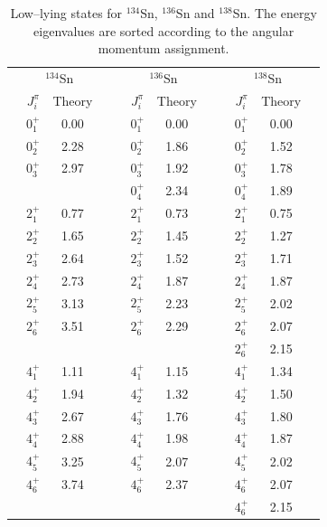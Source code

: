 \documentclass{article}
\begin{document}
\begin{table}[htbp]
\caption{Low--lying states for  $^{134}$Sn, $^{136}$Sn and $^{138}$Sn.
The energy eigenvalues are sorted according to the angular momentum assignment.}
\label{tab:even_isotopes}
\begin{center}
\begin{tabular}{|cccc|cccc|cccc|}
\hline
\multicolumn{4}{|c|}{$^{134}$Sn} & \multicolumn{4}{|c|}{ $^{136}$Sn}& \multicolumn{4}{|c|}{ $^{138}$Sn}\\
&{$J^{\pi}_i$}&Theory&&&{$J^{\pi}_i$}&Theory&&&{$J^{\pi}_i$}&Theory& \\

\hline
& $0^{+}_{1}$ & 0.00   &&   &$0^{+}_{1}$ & 0.00   &&   &$0^{+}_{1}$ & 0.00   &\\
& $0^{+}_{2}$ & 2.28   &&   &$0^{+}_{2}$ & 1.86   &&   &$0^{+}_{2}$ & 1.52   &\\
& $0^{+}_{3}$ & 2.97   &&   &$0^{+}_{3}$ & 1.92   &&   &$0^{+}_{3}$ & 1.78   &\\
&             &        &&   &$0^{+}_{4}$ & 2.34   &&   &$0^{+}_{4}$ & 1.89   &\\

\hline
& $2^{+}_{1}$ & 0.77   &&   &$2^{+}_{1}$ & 0.73   &&   &$2^{+}_{1}$ & 0.75   &\\
& $2^{+}_{2}$ & 1.65   &&   &$2^{+}_{2}$ & 1.45   &&   &$2^{+}_{2}$ & 1.27   &\\
& $2^{+}_{3}$ & 2.64   &&   &$2^{+}_{3}$ & 1.52   &&   &$2^{+}_{3}$ & 1.71   &\\
& $2^{+}_{4}$ & 2.73   &&   &$2^{+}_{4}$ & 1.87   &&   &$2^{+}_{4}$ & 1.87   &\\
& $2^{+}_{5}$ & 3.13   &&   &$2^{+}_{5}$ & 2.23   &&   &$2^{+}_{5}$ & 2.02   &\\
& $2^{+}_{6}$ & 3.51   &&   &$2^{+}_{6}$ & 2.29   &&   &$2^{+}_{6}$ & 2.07   &\\
&             &        &&   &            &        &&   &$2^{+}_{6}$ & 2.15   &\\

\hline
& $4^{+}_{1}$ & 1.11   &&   &$4^{+}_{1}$ & 1.15   &&   &$4^{+}_{1}$ & 1.34   &\\
& $4^{+}_{2}$ & 1.94   &&   &$4^{+}_{2}$ & 1.32   &&   &$4^{+}_{2}$ & 1.50   &\\
& $4^{+}_{3}$ & 2.67   &&   &$4^{+}_{3}$ & 1.76   &&   &$4^{+}_{3}$ & 1.80   &\\
& $4^{+}_{4}$ & 2.88   &&   &$4^{+}_{4}$ & 1.98   &&   &$4^{+}_{4}$ & 1.87   &\\
& $4^{+}_{5}$ & 3.25   &&   &$4^{+}_{5}$ & 2.07   &&   &$4^{+}_{5}$ & 2.02   &\\
& $4^{+}_{6}$ & 3.74   &&   &$4^{+}_{6}$ & 2.37   &&   &$4^{+}_{6}$ & 2.07   &\\
&             &        &&   &            &        &&   &$4^{+}_{6}$ & 2.15   &\\


\end{tabular}
\end{center}
\end{table}
\end{document}
